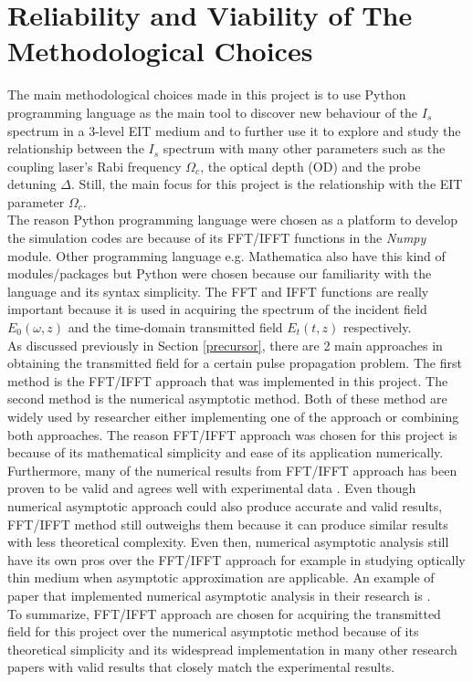 \section{Reliability and Viability of The Methodological Choices}
The main methodological choices made in this project is to use Python programming language as the main tool to discover new behaviour of the $I_{s}$ spectrum in a 3-level EIT medium and to further use it to explore and study the relationship between the $I_{s}$ spectrum with many other parameters such as the coupling laser's Rabi frequency $\Omega_{c}$, the optical depth (OD) and the probe detuning $\Delta$. Still, the main focus for this project is the relationship with the EIT parameter $\Omega_{c}$.\\

The reason Python programming language were chosen as a platform to develop the simulation codes are because of its FFT/IFFT functions in the \textit{Numpy} module. Other programming language e.g. Mathematica also have this kind of modules/packages but Python were chosen because our familiarity with the language and its syntax simplicity. The FFT and IFFT functions are really important because it is used in acquiring the spectrum of the incident field $E_{0}(\omega, z)$ and the time-domain transmitted field $E_{t}(t, z)$ respectively.\\

As discussed previously in Section \ref{precursor}, there are 2 main approaches in obtaining the transmitted field for a certain pulse propagation problem. The first method is the FFT/IFFT approach that was implemented in this project. The second method is the numerical asymptotic method. Both of these method are widely used by researcher either implementing one of the approach or combining both approaches. The reason FFT/IFFT approach was chosen for this project is because of its mathematical simplicity and ease of its application numerically. Furthermore, many of the numerical results from FFT/IFFT approach has been proven to be valid and agrees well with experimental data \cite{Macke2013, Oughstun2010, Jeong2008, jeong2010slow}. Even though numerical asymptotic approach could also produce accurate and valid results, FFT/IFFT method still outweighs them because it can produce similar results with less theoretical complexity. Even then, numerical asymptotic analysis still have its own pros over the FFT/IFFT approach for example in studying optically thin medium when asymptotic approximation are applicable. An example of paper that implemented numerical asymptotic analysis in their research is \cite{Jeong2009}.\\

To summarize, FFT/IFFT approach are chosen for acquiring the transmitted field for this project over the numerical asymptotic method because of its theoretical simplicity and its widespread implementation in many other research papers with valid results that closely match the experimental results.
